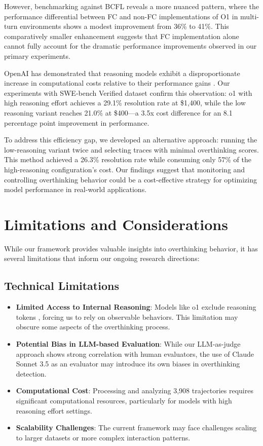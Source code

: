However, benchmarking against BCFL \cite{berkeley-function-calling-leaderboard} reveals a more nuanced pattern, where the performance differential between FC and non-FC implementations of O1 in multi-turn environments shows a modest improvement from 36\% to 41\%. This comparatively smaller enhancement suggests that FC implementation alone cannot fully account for the dramatic performance improvements observed in our primary experiments.

OpenAI has demonstrated that reasoning models exhibit a disproportionate increase in computational costs relative to their performance gains \cite{arcprize2024oai}. Our experiments with SWE-bench Verified dataset confirm this observation: o1 with high reasoning effort achieves a 29.1\% resolution rate at \$1,400, while the low reasoning variant reaches 21.0\% at \$400—a 3.5x cost difference for an 8.1 percentage point improvement in performance.

To address this efficiency gap, we developed an alternative approach: running the low-reasoning variant twice and selecting traces with minimal overthinking scores. This method achieved a 26.3\% resolution rate while consuming only 57\% of the high-reasoning configuration's cost. Our findings suggest that monitoring and controlling overthinking behavior could be a cost-effective strategy for optimizing model performance in real-world applications.

\section{Limitations and Considerations}
\label{sec:limitations}

While our framework provides valuable insights into overthinking behavior, it has several limitations that inform our ongoing research directions:

\subsection{Technical Limitations}
\begin{itemize}
    \item \textbf{Limited Access to Internal Reasoning}: Models like o1 exclude reasoning tokens \cite{openai_learning_to_reason_2024}, forcing us to rely on observable behaviors. This limitation may obscure some aspects of the overthinking process.
    
    \item \textbf{Potential Bias in LLM-based Evaluation}: While our LLM-as-judge approach shows strong correlation with human evaluators, the use of Claude Sonnet 3.5 as an evaluator may introduce its own biases in overthinking detection.
    
    \item \textbf{Computational Cost}: Processing and analyzing 3,908 trajectories requires significant computational resources, particularly for models with high reasoning effort settings.
    
    \item \textbf{Scalability Challenges}: The current framework may face challenges scaling to larger datasets or more complex interaction patterns.
\end{itemize}

